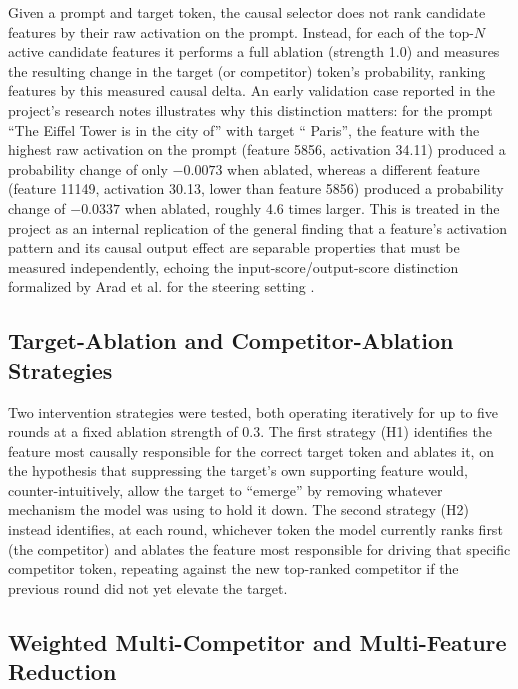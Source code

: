 \documentclass[conference]{IEEEtran}
\begin{document}
Given a prompt and target token, the causal selector does not rank candidate features by their raw activation on the prompt. Instead, for each of the top-$N$ active candidate features it performs a full ablation (strength 1.0) and measures the resulting change in the target (or competitor) token's probability, ranking features by this measured causal delta. An early validation case reported in the project's research notes illustrates why this distinction matters: for the prompt ``The Eiffel Tower is in the city of'' with target `` Paris'', the feature with the highest raw activation on the prompt (feature 5856, activation 34.11) produced a probability change of only $-0.0073$ when ablated, whereas a different feature (feature 11149, activation 30.13, lower than feature 5856) produced a probability change of $-0.0337$ when ablated, roughly 4.6 times larger. This is treated in the project as an internal replication of the general finding that a feature's activation pattern and its causal output effect are separable properties that must be measured independently, echoing the input-score/output-score distinction formalized by Arad et al. for the steering setting \cite{arad2025steering}.

\subsection{Target-Ablation and Competitor-Ablation Strategies}

Two intervention strategies were tested, both operating iteratively for up to five rounds at a fixed ablation strength of 0.3. The first strategy (H1) identifies the feature most causally responsible for the correct target token and ablates it, on the hypothesis that suppressing the target's own supporting feature would, counter-intuitively, allow the target to ``emerge'' by removing whatever mechanism the model was using to hold it down. The second strategy (H2) instead identifies, at each round, whichever token the model currently ranks first (the competitor) and ablates the feature most responsible for driving that specific competitor token, repeating against the new top-ranked competitor if the previous round did not yet elevate the target.

\subsection{Weighted Multi-Competitor and Multi-Feature Reduction}
\end{document}
